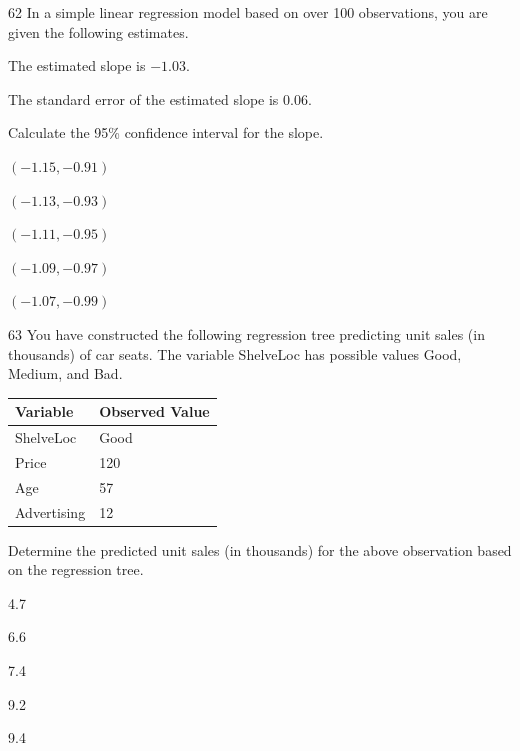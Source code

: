 \begin{question}{62}
In a simple linear regression model based on over 100 observations, you are given the following estimates.

\begin{given}
\item The estimated slope is $-1.03$.
\item The standard error of the estimated slope is 0.06.
\end{given}

Calculate the 95\% confidence interval for the slope.

\begin{choices}
\item $(-1.15, -0.91)$
\item $(-1.13, -0.93)$
\item $(-1.11, -0.95)$
\item $(-1.09, -0.97)$
\item $(-1.07, -0.99)$
\end{choices}
\end{question}

\begin{question}{63}
You have constructed the following regression tree predicting unit sales (in thousands) of car seats. The variable ShelveLoc has possible values Good, Medium, and Bad.


\begin{center}
\begin{tabular}{|l|l|}
\hline
\textbf{Variable} & \textbf{Observed Value} \\ \hline
ShelveLoc   & Good   \\ \hline
Price       & 120    \\ \hline
Age         & 57     \\ \hline
Advertising & 12     \\ \hline
\end{tabular}
\end{center}

Determine the predicted unit sales (in thousands) for the above observation based on the regression tree.

\begin{choices}
\item 4.7
\item 6.6
\item 7.4
\item 9.2
\item 9.4
\end{choices}
\end{question}

